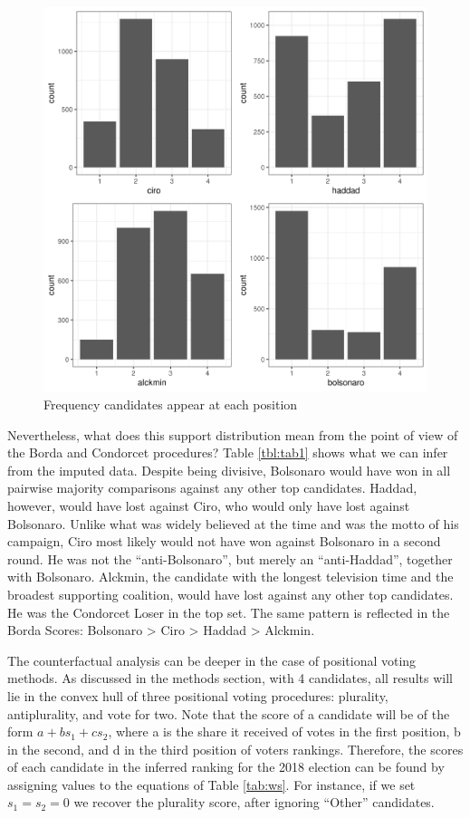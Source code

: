 \documentclass[hidelinks,11pt]{article}
\begin{document}
\begin{figure}[H]
 \centering
 \includegraphics[width=0.8\columnwidth,
 height=0.5\textheight]{./images/corrected1_indexes_plot.png}
 \caption{Frequency candidates appear at each position}
 \label{fig:counts}
\end{figure}

Nevertheless, what does this support distribution mean from the point of view of the Borda and Condorcet procedures? Table \ref{tbl:tab1} shows what we can infer from the imputed data. Despite being divisive, Bolsonaro would have won in all pairwise majority comparisons against any other top candidates. Haddad, however, would have lost against Ciro, who would only have lost against Bolsonaro. Unlike what was widely believed at the time and was the motto of his campaign, Ciro most likely would not have won against Bolsonaro in a second round. He was not the ``anti-Bolsonaro'', but merely an ``anti-Haddad'', together with Bolsonaro. Alckmin, the candidate with the longest television time and the broadest supporting coalition, would have lost against any other top candidates. He was the Condorcet Loser in the top set. The same pattern is reflected in the Borda Scores: Bolsonaro > Ciro > Haddad > Alckmin.





The counterfactual analysis can be deeper in the case of positional voting
methods. As discussed in the methods section, with 4 candidates, all results will
lie in the convex hull of three positional voting procedures: plurality,
antiplurality, and vote for two. Note that the score of a candidate will be of the
form \(a + bs_{1} + cs_{2}\), where a is the share it received of votes in the
first position, b in the second, and d in the third position of voters rankings.
Therefore, the scores of each candidate in the inferred ranking for the 2018 election can be found by assigning values to the equations of Table
\ref{tab:ws}. For instance, if we set \(s_{1} = s_{2} = 0\) we recover the
plurality score, after ignoring ``Other'' candidates.
\end{document}
